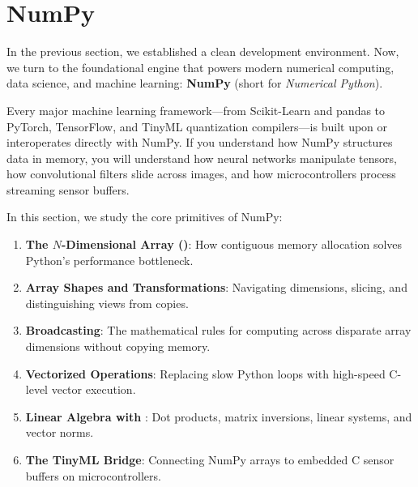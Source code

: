 \section{NumPy}\label{sec:numpy}

In the previous section, we established a clean development environment. Now, we turn to the foundational engine that powers modern numerical computing, data science, and machine learning: \textbf{NumPy} (short for \textit{Numerical Python}).

Every major machine learning framework—from Scikit-Learn and pandas to PyTorch, TensorFlow, and TinyML quantization compilers—is built upon or interoperates directly with NumPy. If you understand how NumPy structures data in memory, you will understand how neural networks manipulate tensors, how convolutional filters slide across images, and how microcontrollers process streaming sensor buffers.

In this section, we study the core primitives of NumPy:
\begin{enumerate}
    \item \textbf{The $N$-Dimensional Array ()}: How contiguous memory allocation solves Python's performance bottleneck.
    \item \textbf{Array Shapes and Transformations}: Navigating dimensions, slicing, and distinguishing views from copies.
    \item \textbf{Broadcasting}: The mathematical rules for computing across disparate array dimensions without copying memory.
    \item \textbf{Vectorized Operations}: Replacing slow Python loops with high-speed C-level vector execution.
    \item \textbf{Linear Algebra with }: Dot products, matrix inversions, linear systems, and vector norms.
    \item \textbf{The TinyML Bridge}: Connecting NumPy arrays to embedded C sensor buffers on microcontrollers.
\end{enumerate}

